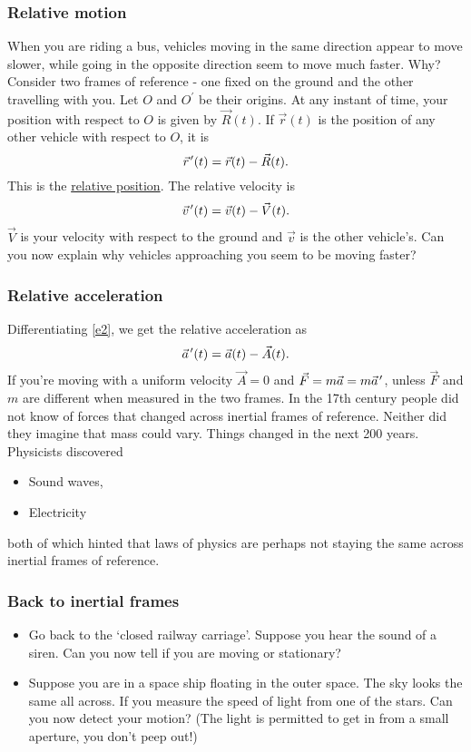 \documentclass{beamer}
\newcommand{\pvec}[1]{\vec{#1}\mkern2mu\vphantom{#1}}
\begin{document}
\begin{frame}
\frametitle{Relative motion}
When you are riding a bus, vehicles moving in the same direction appear
to move slower, while going in the opposite direction seem to move much faster.
Why? Consider two frames of reference - one fixed on the ground and the other
travelling with you. Let $O$ and $O^\prime$ be their origins. At any instant of
time, your position with respect to $O$ is given by $\vec{R}(t)$. If 
$\vec{r}(t)$ is the position of any other vehicle with respect to $O$, it is
\begin{equation}\label{e1}
\pvec{r}^\prime(t) = \vec{r}(t) - \vec{R}(t).
\end{equation}
This is the \href{https://drive.google.com/file/d/11bb3OxTawNKyr9l5fGHWv3w22FmUZS-y/view?usp=sharing}{relative position}.
The relative velocity is
\begin{equation}\label{e2}
\pvec{v}^\prime(t) = \vec{v}(t) - \vec{V}(t).
\end{equation}
$\vec{V}$ is your velocity with respect to the ground and $\vec{v}$ is the other
vehicle's. Can you now explain why vehicles approaching you seem to be moving
faster?
\end{frame}

\begin{frame}
\frametitle{Relative acceleration}
Differentiating \eqref{e2}, we get the relative acceleration as
\begin{equation}\label{e3}
\pvec{a}^\prime(t) = \vec{a}(t) - \vec{A}(t).
\end{equation}
If you're moving with a uniform velocity $\vec{A} = 0$ and $\vec{F} = m\vec{a}
= m\pvec{a}^\prime$, unless $\vec{F}$ and $m$ are different when measured in 
the two frames. In the 17th century people did not know of forces that changed
across inertial frames of reference. Neither did they imagine that mass could
vary. Things changed in the next 200 years. Physicists discovered
\begin{itemize}
\item Sound waves,
\item Electricity
\end{itemize}
both of which hinted that laws of physics are perhaps not staying the same
across inertial frames of reference.
\end{frame}

\begin{frame}
\frametitle{Back to inertial frames}
\begin{itemize}
\item Go back to the `closed railway carriage'. Suppose you hear the sound of 
a siren. Can you now tell if you are moving or stationary?
\item Suppose you are in a space ship floating in the outer space. The sky looks
the same all across. If you measure the speed of light from one of the stars. 
Can you now detect your motion? (The light is permitted to get in from a small
aperture, you don't peep out!)
\end{itemize}
\end{frame}
\end{document}
